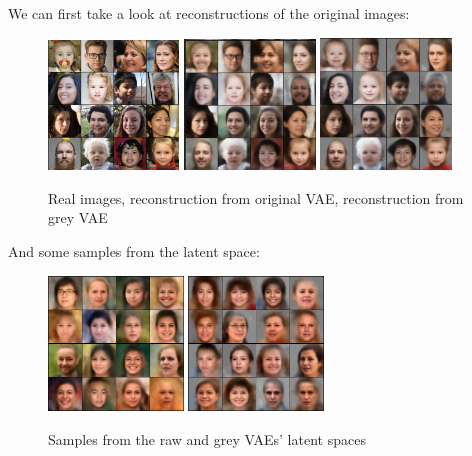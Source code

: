 \documentclass{article}
\begin{document}
We can first take a look at reconstructions of the original images:

\begin{figure}[H]
    \centering
    \includegraphics[width=0.31\textwidth]{images/true_images.png}
    \includegraphics[width=0.31\textwidth]{images/raw_reconstruction.png}
    \includegraphics[width=0.31\textwidth]{images/grey_reconstruction.png}
    \caption{Real images, reconstruction from original VAE, reconstruction from grey VAE}
\end{figure}

And some samples from the latent space:

\begin{figure}[H]
    \centering
    \includegraphics[width=0.32\textwidth]{images/sample_vae_raw.png}
    \includegraphics[width=0.32\textwidth]{images/sample_vae_grey.png}
    \caption{Samples from the raw and grey VAEs' latent spaces}
\end{figure}
\end{document}

